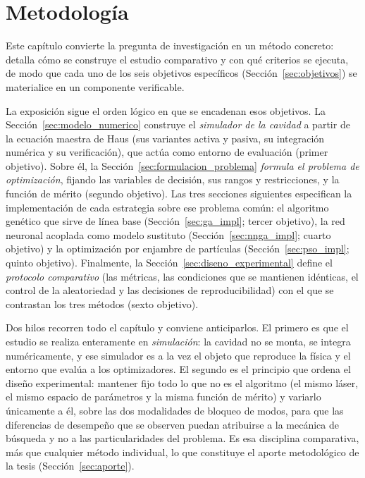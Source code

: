 \chapter{Metodología}
\label{ch:Methodology}


Este capítulo convierte la pregunta de investigación en un método concreto: detalla cómo se construye el estudio comparativo y con qué criterios se ejecuta, de modo que cada uno de los seis objetivos específicos (Sección~\ref{sec:objetivos}) se materialice en un componente verificable.

La exposición sigue el orden lógico en que se encadenan esos objetivos. La
Sección~\ref{sec:modelo_numerico} construye el \emph{simulador de la cavidad} a partir
de la ecuación maestra de Haus (sus variantes activa y pasiva, su integración
numérica y su verificación), que actúa como entorno de evaluación (primer objetivo).
Sobre él, la Sección~\ref{sec:formulacion_problema} \emph{formula el problema de
optimización}, fijando las variables de decisión, sus rangos y restricciones, y la
función de mérito (segundo objetivo). Las tres secciones siguientes especifican la
implementación de cada estrategia sobre ese problema común: el algoritmo genético que
sirve de línea base (Sección~\ref{sec:ga_impl}; tercer objetivo), la red neuronal
acoplada como modelo sustituto (Sección~\ref{sec:nnga_impl}; cuarto objetivo) y la
optimización por enjambre de partículas (Sección~\ref{sec:pso_impl}; quinto objetivo).
Finalmente, la Sección~\ref{sec:diseno_experimental} define el \emph{protocolo
comparativo} (las métricas, las condiciones que se mantienen idénticas, el control de
la aleatoriedad y las decisiones de reproducibilidad) con el que se contrastan los
tres métodos (sexto objetivo).

Dos hilos recorren todo el capítulo y conviene anticiparlos. El primero es que el
estudio se realiza enteramente en \emph{simulación}: la cavidad no se monta, se
integra numéricamente, y ese simulador es a la vez el objeto que reproduce la física
y el entorno que evalúa a los optimizadores. El segundo es el principio que ordena el
diseño experimental: mantener fijo todo lo que no es el algoritmo (el mismo láser, el
mismo espacio de parámetros y la misma función de mérito) y variarlo únicamente a él,
sobre las dos modalidades de bloqueo de modos, para que las diferencias de desempeño
que se observen puedan atribuirse a la mecánica de búsqueda y no a las
particularidades del problema. Es esa disciplina comparativa, más que cualquier
método individual, lo que constituye el aporte metodológico de la tesis
(Sección~\ref{sec:aporte}).


